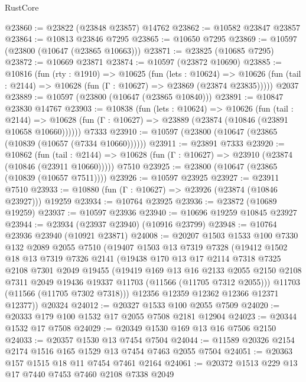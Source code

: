 \begin{lexlean}{RustCore}
\begin{coremodule}
@23860 := @23822 (@23848 @23857) @14762
@23862 := @10582 @23847 @23857
@23864 := @10813 @23846 @7295
@23865 := @10650 @7295
@23869 := @10597 (@23800 (@10647 (@23865 @10663)))
@23871 := @23825 (@10685 @7295)
@23872 := @10669 @23871
@23874 := @10597 (@23872 @10690)
@23885 := @10816
    (fun (rty : @1910) =>
    @10625
      (fun (lets : @10624) =>
      @10626 (fun (tail : @2144) => @10628 (fun (Γ : @10627) => @23869 (@23874 @23835)))))
    @2037
@23889 := @10597 (@23800 (@10647 (@23865 @10840)))
@23891 := @10847 @23830 @14767
@23903 := @10838
    (fun (lets : @10624) =>
    @10626
      (fun (tail : @2144) =>
      @10628 (fun (Γ : @10627) => @23889 (@23874 (@10846 (@23891 @10658 @10660))))))
    @7333
@23910 := @10597 (@23800 (@10647 (@23865 (@10839 (@10657 (@7334 @10660))))))
@23911 := @23891 @7333
@23920 := @10862
    (fun (tail : @2144) => @10628 (fun (Γ : @10627) => @23910 (@23874 (@10846 (@23911 @10660)))))
    @7510
@23925 := @23800 (@10647 (@23865 (@10839 (@10657 @7511))))
@23926 := @10597 @23925
@23927 := @23911 @7510
@23933 := @10880 (fun (Γ : @10627) => @23926 (@23874 (@10846 @23927))) @19259
@23934 := @10764 @23925
@23936 := @23872 (@10689 @19259)
@23937 := @10597 @23936
@23940 := @10696 @19259 @10845 @23927
@23944 := @23934 (@23937 @23940) (@10916 @23799)
@23948 := @10764 @23936 @23940 (@10921 @23871)
@24008 := @20207
    @1503
    @1533
    @100
    @7330
    @132
    @2089
    @2055
    @7510
    (@19407
      @1503
      @13
      @7319
      @7328
      (@19412
        @1502
        @18
        @13
        @7319
        @7326
        @2141
        (@19438
          @170
          @13
          @17
          @2114
          @7318
          @7325
          @2108
          @7301
          @2049
          @19455
          (@19419
            @169
            @13
            @16
            @2133
            @2055
            @2150
            @2108
            @7311
            @2049
            @19436
            @19337
            @11703
            (@11566 (@11705 @7312 @2055)))
          @11703
          (@11566 (@11705 @7302 @7318)))
        @12356
        @12359
        @12362
        @12366
        @12371
        @12377))
    @20324
@24012 := @20327 @1533 @100 @2055 @7509
@24020 := @20333 @179 @100 @1532 @17 @2055 @7508 @2181 @12904
@24023 := @20344 @1532 @17 @7508
@24029 := @20349 @1530 @169 @13 @16 @7506 @2150
@24033 := @20357 @1530 @13 @7454 @7504
@24044 := @11589 @20326 @2154 @2174 @1516 @165 @1529 @13 @7454 @7463 @2055 @7504
@24051 := @20363 @157 @1515 @18 @11 @7454 @7461 @2164
@24061 := @20372 @1513 @229 @13 @17 @7440 @7453 @7460 @2108 @7338 @2049

\end{coremodule}
\end{lexlean}
